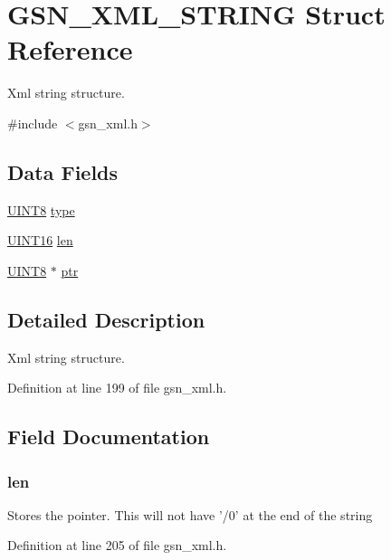 \hypertarget{a00436}{
\section{GSN\_\-XML\_\-STRING Struct Reference}
\label{a00436}
}


Xml string structure.  




{\ttfamily \#include $<$gsn\_\-xml.h$>$}

\subsection*{Data Fields}
\begin{DoxyCompactItemize}
\item 
\hyperlink{a00660_gab27e9918b538ce9d8ca692479b375b6a}{UINT8} \hyperlink{a00436_a631bceb766461ab7475c7ed56717aac8}{type}
\item 
\hyperlink{a00660_ga09f1a1fb2293e33483cc8d44aefb1eb1}{UINT16} \hyperlink{a00436_ab3bcead9c261261394a5d9b3bf8f95cb}{len}
\item 
\hyperlink{a00660_gab27e9918b538ce9d8ca692479b375b6a}{UINT8} $\ast$ \hyperlink{a00436_aff356b2f59162d31b4f15f29467076a0}{ptr}
\end{DoxyCompactItemize}


\subsection{Detailed Description}
Xml string structure. 

Definition at line 199 of file gsn\_\-xml.h.



\subsection{Field Documentation}
\hypertarget{a00436_ab3bcead9c261261394a5d9b3bf8f95cb}{
\subsubsection[{len}]{ {\bf len}}}
\label{a00436_ab3bcead9c261261394a5d9b3bf8f95cb}
Stores the pointer. This will not have '/0' at the end of the string 

Definition at line 205 of file gsn\_\-xml.h.

